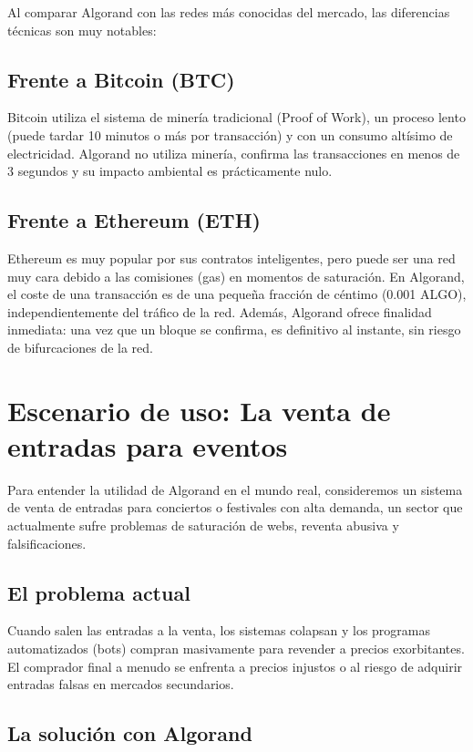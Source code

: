 \documentclass[12pt]{article}
\begin{document}
Al comparar Algorand con las redes más conocidas del mercado, las diferencias técnicas son muy notables:

\subsection{Frente a Bitcoin (BTC)}

Bitcoin utiliza el sistema de minería tradicional (Proof of Work), un proceso lento (puede tardar 10 minutos o más por transacción) y con un consumo altísimo de electricidad. Algorand no utiliza minería, confirma las transacciones en menos de 3 segundos y su impacto ambiental es prácticamente nulo.

\subsection{Frente a Ethereum (ETH)}

Ethereum es muy popular por sus contratos inteligentes, pero puede ser una red muy cara debido a las comisiones (gas) en momentos de saturación. En Algorand, el coste de una transacción es de una pequeña fracción de céntimo (0.001 ALGO), independientemente del tráfico de la red. Además, Algorand ofrece finalidad inmediata: una vez que un bloque se confirma, es definitivo al instante, sin riesgo de bifurcaciones de la red.

\section{Escenario de uso: La venta de entradas para eventos}

Para entender la utilidad de Algorand en el mundo real, consideremos un sistema de venta de entradas para conciertos o festivales con alta demanda, un sector que actualmente sufre problemas de saturación de webs, reventa abusiva y falsificaciones.

\subsection{El problema actual}

Cuando salen las entradas a la venta, los sistemas colapsan y los programas automatizados (bots) compran masivamente para revender a precios exorbitantes. El comprador final a menudo se enfrenta a precios injustos o al riesgo de adquirir entradas falsas en mercados secundarios.

\subsection{La solución con Algorand}
\end{document}
